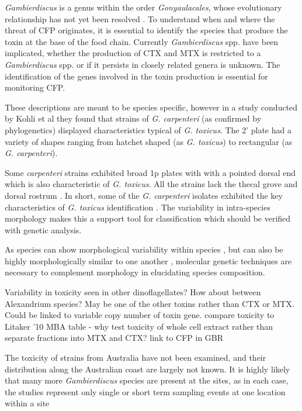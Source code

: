 \documentclass[12pt]{article}
\begin{document}
\emph{Gambierdiscus} is a genus within the order \emph{Gonyaulacales}, whose evolutionary relationship has not yet been resolved \cite{gentekaki2014large}. To understand when and where the threat of CFP originates, it is essential to identify the species that produce the toxin at the base of the food chain. Currently \emph{Gambierdiscus} spp. have been implicated, whether the production of CTX and MTX is restricted to a \emph{Gambierdiscus} spp. or if it  persists in closely related genera is unknown. The identification of the genes involved in the toxin production is essential for monitoring CFP.

These descriptions are meant to be species specific, however in a study conducted by Kohli et al they found that strains of \emph{G. carpenteri} (as confirmed by phylogenetics) displayed characteristics typical of \emph{G. toxicus}. The 2' plate had a variety of shapes ranging from hatchet shaped (as \emph{G. toxicus}) to rectangular (as \emph{G. carpenteri}). 

Some \emph{carpenteri} strains exhibited broad 1p plates with with a pointed dorsal end which is also characteristic of \emph{G. toxicus}. All the strains lack the thecal grove and  dorsal rostrum \cite{litaker2009taxonomy}. In short, some of the \emph{G. carpenteri} isolates exhibited the key characteristics of \emph{G. toxicus} identification \cite{kohli2014high}.
The variability in intra-species morphology makes this a support tool for classification which should be verified with genetic analysis.

 As species can show morphological variability within species \cite{bravo2014cellular}, but can also be highly morphologically similar to one another \cite{kohli2014high}, molecular genetic techniques are necessary to complement morphology in elucidating species composition.

Variability in toxicity 
 seen in other dinoflagellates? How about between Alexandrium species? May be one of the other toxins  rather than CTX or MTX. Could be linked to variable copy number of toxin gene.
compare toxicity to Litaker '10 MBA table - why test toxicity of whole cell extract rather than separate fractions into MTX and CTX?
link to CFP in GBR

 The toxicity of strains from Australia have not been examined, and their distribution along the Australian coast are largely not known. It is highly likely that many more \emph{Gambierdiscus} species are present at the sites, as in each case, the studies represent only single or short term sampling events at one location within a site
 \newline
\end{document}
